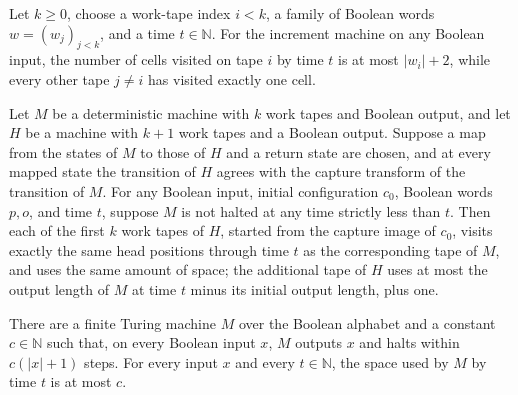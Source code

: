 \begin{theorem}
\label{Turing.incrementTM_spaceUsedByTape}
\leanok
{}
Let $k\ge 0$, choose a work-tape index $i<k$, a family of Boolean words $w=(w_j)_{j<k}$,
and a time $t\in\mathbb N$. For the increment machine on any Boolean input, the number
of cells visited on tape $i$ by time $t$ is at most $|w_i|+2$, while every other tape
$j\ne i$ has visited exactly one cell.
\end{theorem}

\begin{theorem}
\label{Turing.capture_visitedByTapeHead}
\leanok
{}
Let $M$ be a deterministic machine with $k$ work tapes and Boolean output, and let $H$
be a machine with $k+1$ work tapes and a Boolean output. Suppose a map from the states
of $M$ to those of $H$ and a return state are chosen, and at every mapped state the
transition of $H$ agrees with the capture transform of the transition of $M$. For any
Boolean input, initial configuration $c_0$, Boolean words $p,o$, and time $t$, suppose
$M$ is not halted at any time strictly less than $t$. Then each of the first $k$ work
tapes of $H$, started from the capture image of $c_0$, visits exactly the same head
positions through time $t$ as the corresponding tape of $M$, and uses the same amount of
space; the additional tape of $H$ uses at most the output length of $M$ at time $t$
minus its initial output length, plus one.
\end{theorem}

\begin{theorem}
\label{Turing.FinTM.computesFunInTime_id_spaceUsed}
\leanok
{}
There are a finite Turing machine $M$ over the Boolean alphabet and a constant
$c\in\mathbb{N}$ such that, on every Boolean input $x$, $M$ outputs $x$ and halts within
$c(|x|+1)$ steps. For every input $x$ and every $t\in\mathbb{N}$, the space used by $M$
by time $t$ is at most $c$.
\end{theorem}

